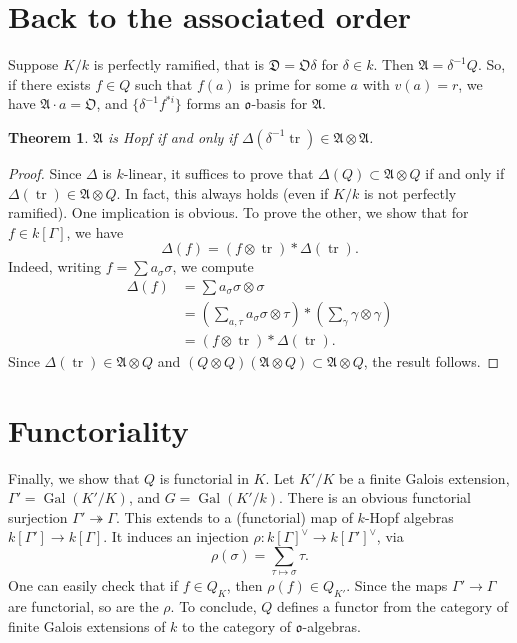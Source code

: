 \documentclass{article}
\DeclareMathOperator{\gal}{Gal}
\DeclareMathOperator{\trace}{tr}
\newcommand{\fA}{\mathfrak{A}}
\newcommand{\fD}{\mathfrak{D}}
\newcommand{\fo}{\mathfrak{o}}
\newcommand{\fO}{\mathfrak{O}}
\newtheorem{theorem}[subsection]{Theorem}
\begin{document}
\section{Back to the associated order}

Suppose $K/k$ is perfectly ramified, that is $\fD=\fO\delta$ for $\delta\in k$. 
Then $\fA=\delta^{-1} Q$. So, if there exists $f\in Q$ such that $f(a)$ is 
prime for some $a$ with $v(a)=r$, we have $\fA\cdot a=\fO$, and 
$\{\delta^{-1}f^{\ast i}\}$ forms an $\fo$-basis for $\fA$. 

\begin{theorem}
$\fA$ is Hopf if and only if $\Delta(\delta^{-1}\trace)\in \fA\otimes\fA$. 
\end{theorem}
\begin{proof}
Since $\Delta$ is $k$-linear, it suffices to prove that 
$\Delta(Q)\subset \fA\otimes Q$ if and only if 
$\Delta(\trace)\in \fA\otimes Q$. In fact, this always holds (even if $K/k$ is 
not perfectly ramified). One implication is obvious. To prove the other, we 
show that for $f\in k[\Gamma]$, we have 
\[
  \Delta(f) = (f\otimes \trace)\ast \Delta(\trace) .
\]
Indeed, writing $f=\sum a_\sigma \sigma$, we compute 
\begin{align*}
  \Delta(f) 
    &= \sum a_\sigma \sigma\otimes \sigma \\
    &= \left( \sum_{a,\tau}a_\sigma \sigma\otimes \tau\right) \ast \left(\sum_\gamma \gamma\otimes \gamma\right) \\
    &= (f\otimes \trace)\ast \Delta(\trace). 
\end{align*}
Since $\Delta(\trace)\in \fA\otimes Q$ and 
$(Q\otimes Q)(\fA\otimes Q)\subset \fA\otimes Q$, the result follows. 
\end{proof}





\section{Functoriality}

Finally, we show that $Q$ is functorial in $K$. Let $K'/K$ be a finite Galois 
extension, $\Gamma'=\gal(K'/K)$, and $G=\gal(K'/k)$. There is an obvious 
functorial surjection $\Gamma'\twoheadrightarrow\Gamma$. This extends to a 
(functorial) map of $k$-Hopf algebras $k[\Gamma']\to k[\Gamma]$. It induces 
an injection $\rho:k[\Gamma]^\vee\to k[\Gamma']^\vee$, via 
\[
  \rho(\sigma) = \sum_{\tau\mapsto\sigma} \tau .
\]
One can easily check that if $f\in Q_K$, then $\rho(f)\in Q_{K'}$. Since the 
maps $\Gamma'\to \Gamma$ are functorial, so are the $\rho$. To conclude, $Q$ 
defines a functor from the category of finite Galois extensions of $k$ to the 
category of $\fo$-algebras. 





\printbibliography
\end{document}
